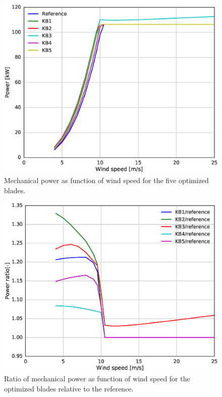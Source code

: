\begin{figure}[pht]
\begin{center}
	\includegraphics[width=.85\linewidth]{figures/KBcomp_power.eps}
\end{center}
\caption{Mechanical power as function of wind speed for the five optimized blades.}
\label{fig:power}
\end{figure}

\begin{figure}[pht]
\begin{center}
	\includegraphics[width=.85\linewidth]{figures/KBcomp_power_ratio.eps}
\end{center}
\caption{Ratio of mechanical power as function of wind speed for the optimized blades relative to the reference.}
\label{fig:powerratio}
\end{figure}

